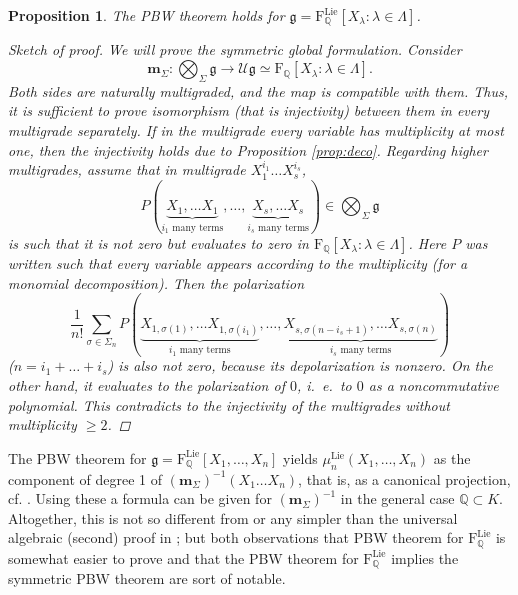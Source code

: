 \documentclass[11pt,a4paper]{amsart}
\newcommand{\plabel}[1]{ \label{#1}}
\newcommand{\snewpage}{}
\newcommand{\plabel}[1]{ \label{#1}\rlap{\smash{${}^{^{[#1]}}$}}}
\newcommand{\snewpage}{\newpage}
\newcommand{\plabel}[1]{ \label{#1}}
\newcommand{\snewpage}{}
\DeclareMathOperator{\Lie}{Lie}
\newcommand{\bo}{\boldsymbol}
\theoremstyle{definition}
\theoremstyle{plain}
\newtheorem{prop}[point]{Proposition}
\begin{document}
\begin{prop} The PBW theorem holds for  $\mathfrak g=\mathrm F_{\mathbb Q}^{\Lie}[X_\lambda:\lambda\in\Lambda]$.
\begin{proof}[Sketch of proof]
We will prove the symmetric global formulation.
Consider
\[\boldsymbol m_\Sigma:\textstyle{\bigotimes_\Sigma\mathfrak g}\rightarrow\mathcal U\mathfrak g\simeq
\mathrm F_{\mathbb Q}[X_\lambda:\lambda\in\Lambda]. \]
Both sides are naturally multigraded, and the map is compatible with them.
Thus, it is sufficient to prove isomorphism (that is injectivity) between them in every multigrade separately.
If in the multigrade every variable has multiplicity at most one, then the injectivity holds due to Proposition \ref{prop:deco}.
Regarding higher multigrades, assume that in  multigrade $X_1^{i_1}\ldots X_s^{i_s}$,
\[P(\underbrace{X_1,\ldots X_1}_{i_1\text{ many terms}},\ldots,\underbrace{X_s,\ldots X_s}_{i_s\text{ many terms}})\in \textstyle{\bigotimes_\Sigma\mathfrak g}\]
 is such that it is not zero but evaluates to zero in $ \mathrm F_{\mathbb Q}[X_\lambda:\lambda\in\Lambda]$.
Here $P$ was written such that every variable appears according to the multiplicity (for a  monomial decomposition).
Then the polarization
\begin{equation}
\frac1{n!}\sum_{\sigma\in \Sigma_n}P(\underbrace{X_{1,\sigma(1)},\ldots X_{1,\sigma(i_1)}}_{i_1\text{ many terms}},\ldots,\underbrace{X_{s,\sigma(n-i_s+1)},\ldots X_{s,\sigma(n)}}_{i_s\text{ many terms}})
\plabel{eq:polar}
\end{equation}
($n=i_1+\ldots+i_s$) is also not zero, because its depolarization is nonzero.
On the other hand, it evaluates to
 the polarization of $0$, i.~e.~to $0$ as a noncommutative polynomial.
This contradicts to the injectivity of the multigrades without multiplicity $\geq2$.
\end{proof}
\end{prop}


The PBW theorem for $\mathfrak g=\mathrm F^{\Lie}_{\mathbb Q}[X_1,\ldots, X_n]$ yields $\mu^{\Lie}_n(X_1,\ldots,X_n)$
 as the component of degree 1 of $(\bo m_\Sigma )^{-1}(X_1\ldots X_n)$, that is, as a canonical projection, cf. \cite{LLX}.
Using these a formula can be given for $(\bo m_\Sigma )^{-1}$ in the general case $\mathbb Q\subset K$.
Altogether, this is not so different from or any simpler than the universal algebraic (second) proof in \cite{LLX};
 but both observations that PBW theorem for $\mathrm F^{\Lie}_{\mathbb Q}$ is somewhat easier to prove
 and that the PBW theorem for $\mathrm F^{\Lie}_{\mathbb Q}$ implies the symmetric PBW theorem
 are sort of notable.
\snewpage
\end{document}
